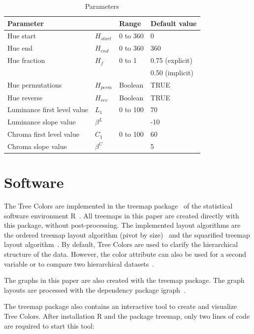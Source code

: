 \documentclass[journal]{vgtc}                %
\begin{document}
\begin{table}[tb]
\begin{footnotesize}
\begin{tabular}{llll}
\toprule
\multicolumn{2}{l}{Parameter    } & Range & Default value \\
\midrule
Hue start 				& $H_{start}$ &0 to 360  & 0      \\
Hue end   				& $H_{end}$ & 0 to 360 & 360       \\
Hue fraction 				& $H_f$	& 0 to 1 & 0.75 (explicit) \\
					&	&	 & 0.50 (implicit) \\
Hue permutations 			& $H_{perm}$ &Boolean & TRUE      \\
Hue reverse   			& $H_{rev}$ & Boolean  & TRUE      \\
Luminance first level value 	& $L_1$	& 0 to 100  & 70      \\
Luminance slope value 		& $\beta^L$ &       & -10       \\
Chroma first level value 		& $C_1$ &  0 to 100  & 60       \\
Chroma slope value 		& $\beta^C$ &     & 5       \\
\bottomrule
\end{tabular}
\end{footnotesize}
\caption{Parameters}\label{table:param}
\end{table}




\section{Software}

The Tree Colors are implemented in the treemap package~\cite{treemap} of the statistical software environment R~\cite{r2013}. All treemaps in this paper are created directly with this package, without post-processing. The implemented layout algorithms are the ordered treemap layout algorithm (pivot by size)~\cite{Bederson2002} and the squarified treemap layout algorithm~\cite{bruls99}. By default, Tree Colors are used to clarify the hierarchical structure of the data. However, the color attribute can also be used for a second variable or to compare two hierarchical datasets~\cite{tennekes2011b}. 

The graphs in this paper are also created with the treemap package. The graph layouts are processed with the dependency package igraph~\cite{igraph}.

The treemap package also contains an interactive tool to create and visualize Tree Colors. After installation R and the package treemap, only two lines of code are required to start this tool:
\end{document}
